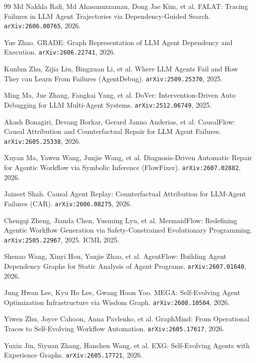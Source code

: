 \begin{thebibliography}{99}
 Md Nakhla Rafi, Md Ahasanuzzaman, Dong Jae Kim, et al.
  FALAT: Tracing Failures in LLM Agent Trajectories via Dependency-Guided
  Search. \texttt{arXiv:2606.00765}, 2026.

 Yue Zhao. GRADE: Graph Representation of LLM Agent
  Dependency and Execution. \texttt{arXiv:2606.22741}, 2026.

 Kunlun Zhu, Zijia Liu, Bingxuan Li, et al. Where LLM
  Agents Fail and How They can Learn From Failures (AgentDebug).
  \texttt{arXiv:2509.25370}, 2025.

 Ming Ma, Jue Zhang, Fangkai Yang, et al. DoVer:
  Intervention-Driven Auto Debugging for LLM Multi-Agent Systems.
  \texttt{arXiv:2512.06749}, 2025.

 Akash Bonagiri, Devang Borkar, Gerard Janno
  Anderias, et al. CausalFlow: Causal Attribution and Counterfactual
  Repair for LLM Agent Failures. \texttt{arXiv:2605.25338}, 2026.

 Xuyan Ma, Yawen Wang, Junjie Wang, et al.
  Diagnosis-Driven Automatic Repair for Agentic Workflow via Symbolic
  Inference (FlowFixer). \texttt{arXiv:2607.02882}, 2026.

 Jaineet Shah. Causal Agent Replay: Counterfactual
  Attribution for LLM-Agent Failures (CAR). \texttt{arXiv:2606.08275},
  2026.

 Chengqi Zheng, Jianda Chen, Yueming Lyu, et al.
  MermaidFlow: Redefining Agentic Workflow Generation via
  Safety-Constrained Evolutionary Programming. \texttt{arXiv:2505.22967},
  2025. ICML 2025.

 Shenao Wang, Xinyi Hou, Yanjie Zhao, et al. AgentFlow:
  Building Agent Dependency Graphs for Static Analysis of Agent Programs.
  \texttt{arXiv:2607.01640}, 2026.

 Jung Hwan Lee, Kyu Ho Lee, Gwang Hoon Yoo. MEGA:
  Self-Evolving Agent Optimization Infrastructure via Wisdom Graph.
  \texttt{arXiv:2608.10504}, 2026.

 Yiwen Zhu, Joyce Cahoon, Anna Pavlenko, et al.
  GraphMind: From Operational Traces to Self-Evolving Workflow
  Automation. \texttt{arXiv:2605.17617}, 2026.

 Yuxin Jin, Siyuan Zhang, Hanchen Wang, et al. EXG:
  Self-Evolving Agents with Experience Graphs. \texttt{arXiv:2605.17721},
  2026.


\end{thebibliography}

